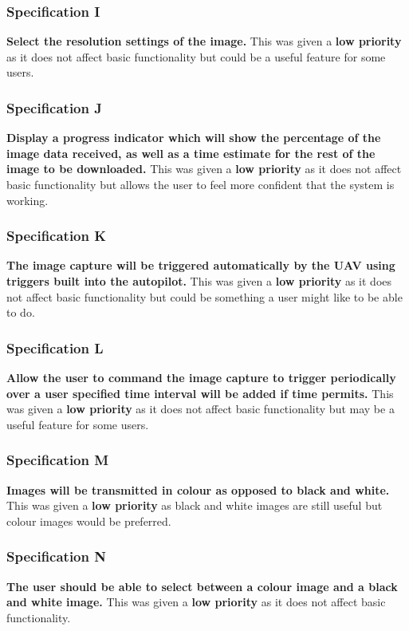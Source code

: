 		\subsubsection{Specification I}\label{sec:spec_i} \textbf{Select the \textbf{resolution settings} of the image.}  
This was given a \textbf{low priority} as it does not affect basic functionality but could be a useful feature for some users.
		\subsubsection{Specification J}\label{sec:spec_j} \textbf{Display a progress indicator which will show the percentage of the image data received, as well as a time estimate for the rest of the image to be downloaded.} 
This was given a \textbf{low priority} as it does not affect basic functionality but allows the user to feel more confident that the system is working.
		\subsubsection{Specification K}\label{sec:spec_k} \textbf{The image capture will be triggered automatically by the UAV using triggers built into the autopilot.}  
This was given a \textbf{low priority} as it does not affect basic functionality but could be something a user might like to be able to do.
		\subsubsection{Specification L}\label{sec:spec_l} \textbf{Allow the user to command the image capture to \textbf{trigger periodically} over a \textbf{user specified time interval} will be added if time permits.} 
This was given a \textbf{low priority} as it does not affect basic functionality but may be a useful feature for some users.
	\subsubsection{Specification M}\label{sec:spec_m} \textbf{Images will be transmitted in \textbf{colour} as opposed to black and white.}  
This was given a \textbf{low priority} as black and white images are still useful but colour images would be preferred.
	\subsubsection{Specification N}\label{sec:spec_n} \textbf{The user should be able to select between a colour image and a black and white image.}  
This was given a \textbf{low priority} as it does not affect basic functionality.



